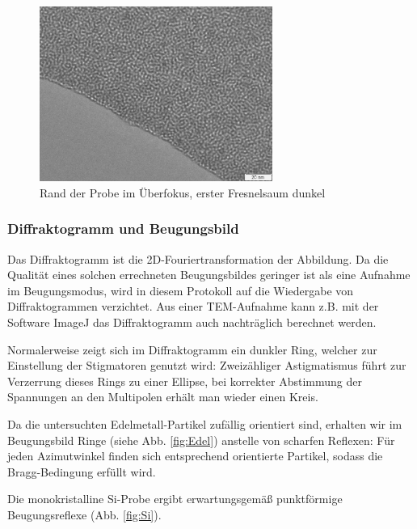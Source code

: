 \begin{figure}[p]
	\centering
	\includegraphics[width=0.68\textwidth]{data/Im_2.jpg}
	\vspace{-1.5ex}
	\caption{\marker Rand der Probe im Überfokus, erster Fresnelsaum dunkel}	\label{fig:Ueber}
	\vspace{-9em}
\end{figure}

\subsubsection{Diffraktogramm und Beugungsbild}
Das Diffraktogramm ist die 2D-Fouriertransformation der Abbildung. Da die Qualität eines solchen errechneten Beugungsbildes geringer ist als eine Aufnahme im Beugungsmodus, wird in diesem Protokoll auf die Wiedergabe von Diffraktogrammen verzichtet. Aus einer TEM-Aufnahme kann z.B. mit der Software ImageJ \cite{lit:ImageJ} das Diffraktogramm auch nachträglich berechnet werden.


Normalerweise zeigt sich im Diffraktogramm ein dunkler Ring, welcher zur Einstellung der Stigmatoren genutzt wird: Zweizähliger Astigmatismus führt zur Verzerrung dieses Rings zu einer Ellipse, bei korrekter Abstimmung der Spannungen an den Multipolen erhält man wieder einen Kreis.

Da die untersuchten Edelmetall-Partikel zufällig orientiert sind, erhalten wir im Beugungsbild Ringe (siehe Abb. \ref{fig:Edel}) anstelle von scharfen Reflexen: Für jeden Azimutwinkel finden sich entsprechend orientierte Partikel, sodass die Bragg-Bedingung erfüllt wird.

Die monokristalline \textsf{Si}-Probe ergibt erwartungsgemäß punktförmige Beugungsreflexe (Abb. \ref{fig:Si}).

